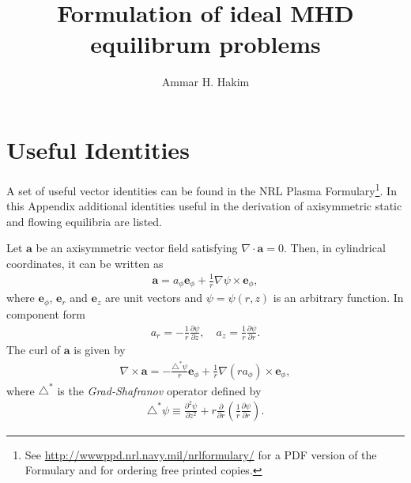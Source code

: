 \documentclass[reqno]{amsart}
\title[Ideal MHD Equilibrium]{Formulation of ideal MHD equilibrum problems}%
\author{Ammar H. Hakim}%
\date{}
\newcommand{\pfrac}[2]{\frac{\partial #1}{\partial #2}}
\newcommand{\mvec}[1]{\mathbf{#1}}
\newcommand{\eep}{\mvec{e}_\phi}
\newcommand{\eer}{\mvec{e}_r}
\newcommand{\eez}{\mvec{e}_z}
\theoremstyle{definition}
\begin{document}
\maketitle

\appendix
\section{Useful Identities}

A set of useful vector identities can be found in the NRL Plasma
Formulary\footnote{See \url{http://wwwppd.nrl.navy.mil/nrlformulary/}
  for a PDF version of the Formulary and for ordering free printed
  copies.}. In this Appendix additional identities useful in the
derivation of axisymmetric static and flowing equilibria are listed.

Let $\mvec{a}$ be an axisymmetric vector field satisfying
$\nabla\cdot\mvec{a} = 0$. Then, in cylindrical coordinates, it can be
written as
\begin{align}
  \mvec{a} = a_\phi \eep + \frac{1}{r}\nabla\psi \times \eep,
\end{align}
where $\eep$, $\eer$ and $\eez$ are unit vectors and $\psi =
\psi(r,z)$ is an arbitrary function. In component form
\begin{align}
  a_r = -\frac{1}{r} \pfrac{\psi}{z}, \quad 
  a_z = \frac{1}{r} \pfrac{\psi}{r}.
\end{align}
The curl of $\mvec{a}$ is given by
\begin{align}
  \nabla\times\mvec{a} = -\frac{\triangle^*\psi}{r}\eep
  + \frac{1}{r} \nabla(ra_\phi)\times\eep, \label{eq:curla}
\end{align}
where $\triangle^*$ is the \emph{Grad-Shafranov} operator defined by
\begin{align}
  \triangle^*\psi \equiv \frac{\partial^2 \psi}{\partial z^2}
  + r \frac{\partial}{\partial r}\left(\frac{1}{r} \pfrac{\psi}{r}\right).
\end{align}
\end{document}
